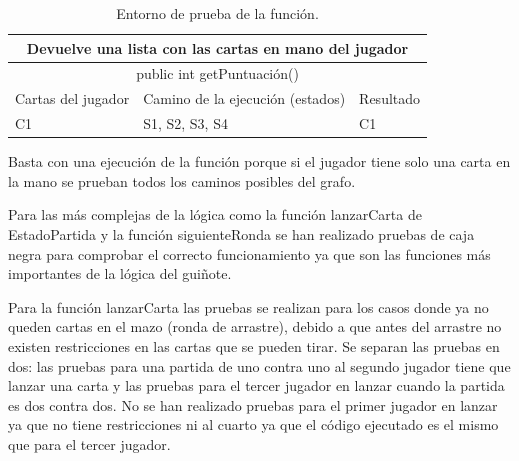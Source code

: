 \begin{table}[htb]
\centering
\begin{tabular}{|l|l|l|}
\hline
\multicolumn{3}{|c|}{Devuelve una lista con las cartas en mano del jugador} \\ \hline
\multicolumn{3}{|c|}{public int getPuntuación()} \\ \hline
Cartas del jugador & Camino de la ejecución (estados) & Resultado \\ \hline	
C1 & S1, S2, S3, S4 & C1 \\ \hline
 \end{tabular}
 \caption{Entorno de prueba de la función.}
\label{}
\end{table}

Basta con una ejecución de la función porque si el jugador tiene solo una carta en la mano se prueban todos los caminos posibles del grafo.

Para las más complejas de la lógica como la función lanzarCarta de EstadoPartida y la función siguienteRonda se han realizado pruebas de caja negra para comprobar el correcto funcionamiento ya que son las funciones más importantes de la lógica del guiñote.

Para la función lanzarCarta las pruebas se realizan para los casos donde ya no queden cartas en el mazo (ronda de arrastre), debido a que antes del arrastre no existen restricciones en las cartas que se pueden tirar. Se separan las pruebas en dos: las pruebas para una partida de uno contra uno al segundo jugador tiene que lanzar una carta y las pruebas para el tercer jugador en lanzar cuando la partida es dos contra dos. No se han realizado pruebas para el primer jugador en lanzar ya que no tiene restricciones ni al cuarto ya que el código ejecutado es el mismo que para el tercer jugador.

